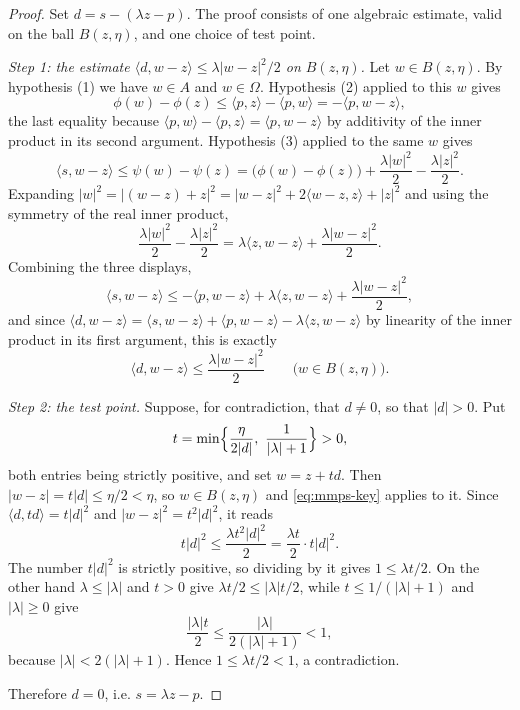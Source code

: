 \begin{proof}
Set $d=s-(\lambda z-p)$. The proof consists of one algebraic estimate, valid on
the ball $B(z,\eta)$, and one choice of test point.

\emph{Step 1: the estimate $\langle d,w-z\rangle\le\lambda|w-z|^2/2$ on
$B(z,\eta)$.}
Let $w\in B(z,\eta)$. By hypothesis (1) we have $w\in A$ and $w\in\Omega$.
Hypothesis (2) applied to this $w$ gives
\[
  \phi(w)-\phi(z)\le\langle p,z\rangle-\langle p,w\rangle
   =-\langle p,w-z\rangle,
\]
the last equality because $\langle p,w\rangle-\langle p,z\rangle=\langle
p,w-z\rangle$ by additivity of the inner product in its second argument.
Hypothesis (3) applied to the same $w$ gives
\[
  \langle s,w-z\rangle\le\psi(w)-\psi(z)
   =\bigl(\phi(w)-\phi(z)\bigr)
     +\frac{\lambda|w|^2}{2}-\frac{\lambda|z|^2}{2}.
\]
Expanding $|w|^2=|(w-z)+z|^2=|w-z|^2+2\langle w-z,z\rangle+|z|^2$ and using the
symmetry of the real inner product,
\begin{equation}\label{eq:mmps-quad}
  \frac{\lambda|w|^2}{2}-\frac{\lambda|z|^2}{2}
   =\lambda\langle z,w-z\rangle+\frac{\lambda|w-z|^2}{2}.
\end{equation}
Combining the three displays,
\[
  \langle s,w-z\rangle
   \le-\langle p,w-z\rangle+\lambda\langle z,w-z\rangle
     +\frac{\lambda|w-z|^2}{2},
\]
and since $\langle d,w-z\rangle=\langle s,w-z\rangle+\langle p,w-z\rangle
-\lambda\langle z,w-z\rangle$ by linearity of the inner product in its first
argument, this is exactly
\begin{equation}\label{eq:mmps-key}
  \langle d,w-z\rangle\le\frac{\lambda|w-z|^2}{2}
  \qquad\bigl(w\in B(z,\eta)\bigr).
\end{equation}

\emph{Step 2: the test point.}
Suppose, for contradiction, that $d\ne0$, so that $|d|>0$. Put
\[
  t=\min\Bigl\{\frac{\eta}{2|d|},\ \frac{1}{|\lambda|+1}\Bigr\}>0,
\]
both entries being strictly positive, and set $w=z+td$. Then
$|w-z|=t|d|\le\eta/2<\eta$, so $w\in B(z,\eta)$ and \eqref{eq:mmps-key} applies
to it. Since $\langle d,td\rangle=t|d|^2$ and $|w-z|^2=t^2|d|^2$, it reads
\[
  t|d|^2\le\frac{\lambda t^2|d|^2}{2}
   =\frac{\lambda t}{2}\cdot t|d|^2 .
\]
The number $t|d|^2$ is strictly positive, so dividing by it gives
$1\le\lambda t/2$. On the other hand $\lambda\le|\lambda|$ and $t>0$ give
$\lambda t/2\le|\lambda|t/2$, while $t\le1/(|\lambda|+1)$ and $|\lambda|\ge0$
give
\[
  \frac{|\lambda|t}{2}\le\frac{|\lambda|}{2(|\lambda|+1)}<1 ,
\]
because $|\lambda|<2(|\lambda|+1)$. Hence $1\le\lambda t/2<1$, a contradiction.

Therefore $d=0$, i.e. $s=\lambda z-p$.
\end{proof}

